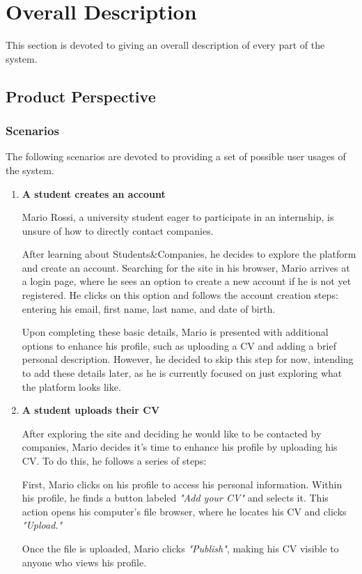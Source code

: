 \chapter{Overall Description}
This section is devoted to giving an overall description of every part of the system.

\section{Product Perspective}
\subsection{Scenarios}
The following scenarios are devoted to providing a set of possible user usages of the system.
\begin{enumerate} 
    \item \textbf{A student creates an account}

    Mario Rossi, a university student eager to participate in an internship, is unsure of how to directly contact companies. 
    
    After learning about Students\&Companies, he decides to explore the platform and create an account. Searching for the site in his browser, Mario arrives at a login page, where he sees an option to create a new account if he is not yet registered. He clicks on this option and follows the account creation steps: entering his email, first name, last name, and date of birth.
    
    Upon completing these basic details, Mario is presented with additional options to enhance his profile, such as uploading a CV and adding a brief personal description. However, he decided to skip this step for now, intending to add these details later, as he is currently focused on just exploring what the platform looks like.
    \item \textbf{A student uploads their CV}

    After exploring the site and deciding he would like to be contacted by companies, Mario decides it’s time to enhance his profile by uploading his CV. To do this, he follows a series of steps:

    First, Mario clicks on his profile to access his personal information. Within his profile, he finds a button labeled \textit{"Add your CV"} and selects it. This action opens his computer's file browser, where he locates his CV and clicks \textit{"Upload."} 
    
    Once the file is uploaded, Mario clicks \textit{"Publish"}, making his CV visible to anyone who views his profile.


\end{enumerate}
